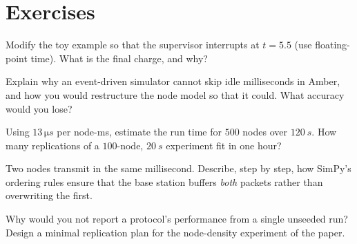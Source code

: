 \section*{Exercises}
\begin{exercise}
Modify the toy example so that the supervisor interrupts at $t=5.5$ (use floating-point time). What is the final charge, and why?
\end{exercise}
\begin{exercise}
Explain why an event-driven simulator cannot skip idle milliseconds in Amber, and how you would restructure the node model so that it could. What accuracy would you lose?
\end{exercise}
\begin{exercise}
Using $13\,\si{\micro s}$ per node-ms, estimate the run time for $500$ nodes over $\SI{120}{s}$. How many replications of a $100$-node, $\SI{20}{s}$ experiment fit in one hour?
\end{exercise}
\begin{exercise}
Two nodes transmit in the same millisecond. Describe, step by step, how SimPy's ordering rules ensure that the base station buffers \emph{both} packets rather than overwriting the first.
\end{exercise}
\begin{exercise}
Why would you not report a protocol's performance from a single unseeded run? Design a minimal replication plan for the node-density experiment of the paper.
\end{exercise}
